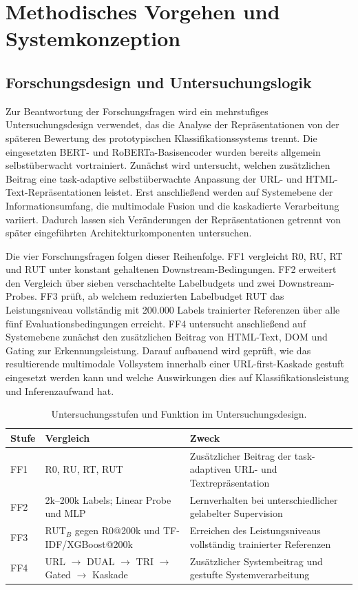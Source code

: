 \chapter{Methodisches Vorgehen und Systemkonzeption}

\section{Forschungsdesign und Untersuchungslogik}

Zur Beantwortung der Forschungsfragen wird ein mehrstufiges Untersuchungsdesign verwendet,
das die Analyse der Repräsentationen von der späteren Bewertung des prototypischen
Klassifikationssystems trennt. Die eingesetzten BERT- und RoBERTa-Basisencoder wurden bereits
allgemein selbstüberwacht vortrainiert. Zunächst wird untersucht, welchen zusätzlichen Beitrag
eine task-adaptive selbstüberwachte Anpassung der URL- und HTML-Text-Repräsentationen
leistet. Erst anschließend werden auf Systemebene der Informationsumfang, die multimodale
Fusion und die kaskadierte Verarbeitung variiert. Dadurch lassen sich Veränderungen der
Repräsentationen getrennt von später eingeführten Architekturkomponenten untersuchen.

Die vier Forschungsfragen folgen dieser Reihenfolge. FF1 vergleicht R0, RU, RT und RUT
unter konstant gehaltenen Downstream-Bedingungen. FF2 erweitert den Vergleich über sieben
verschachtelte Labelbudgets und zwei Downstream-Probes. FF3 prüft, ab welchem reduzierten
Labelbudget RUT das Leistungsniveau vollständig mit 200.000 Labels trainierter Referenzen
über alle fünf Evaluationsbedingungen erreicht. FF4 untersucht anschließend auf Systemebene zunächst den zusätzlichen Beitrag von
HTML-Text, DOM und Gating zur Erkennungsleistung. Darauf aufbauend wird geprüft, wie das
resultierende multimodale Vollsystem innerhalb einer URL-first-Kaskade gestuft eingesetzt
werden kann und welche Auswirkungen dies auf Klassifikationsleistung und Inferenzaufwand hat.

\begin{table}[htbp]
\centering
\small
\setlength{\tabcolsep}{4pt}
\renewcommand{\arraystretch}{1.12}
\caption{Untersuchungsstufen und Funktion im Untersuchungsdesign.}
\label{tab:untersuchungslogik}
\begin{tabular}{p{}p{}p{}}
\hline
\textbf{Stufe} & \textbf{Vergleich} & \textbf{Zweck} \\
\hline
FF1 & R0, RU, RT, RUT & Zusätzlicher Beitrag der task-adaptiven URL- und Textrepräsentation \\
FF2 & 2k--200k Labels; Linear Probe und MLP & Lernverhalten bei unterschiedlicher gelabelter Supervision \\
FF3 & RUT$_B$ gegen R0@200k und TF-IDF/XGBoost@200k & Erreichen des Leistungsniveaus vollständig trainierter Referenzen \\
FF4 & URL $\rightarrow$ DUAL $\rightarrow$ TRI $\rightarrow$ Gated $\rightarrow$ Kaskade & Zusätzlicher Systembeitrag und gestufte Systemverarbeitung \\
\hline
\end{tabular}
\end{table}

